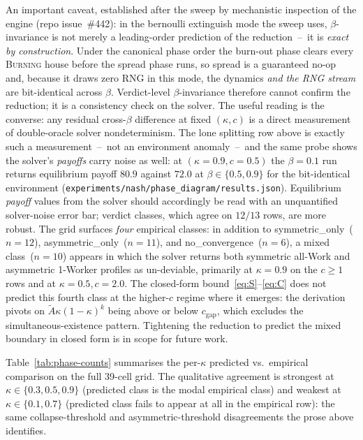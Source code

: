 \documentclass{anvil-paper}
\begin{document}
An important caveat, established after the sweep by mechanistic
inspection of the engine (repo issue~\#442): in the bernoulli extinguish
mode the sweep uses, $\beta$-invariance is not merely a leading-order
prediction of the reduction~--~it is \emph{exact by construction}. Under
the canonical phase order the burn-out phase clears every
\textsc{Burning} house before the spread phase runs, so spread is a
guaranteed no-op and, because it draws zero RNG in this mode, the
dynamics \emph{and the RNG stream} are bit-identical across $\beta$.
Verdict-level $\beta$-invariance therefore cannot confirm the reduction;
it is a consistency check on the solver. The useful reading is the
converse: any residual cross-$\beta$ difference at fixed $(\kappa,c)$ is
a direct measurement of double-oracle solver nondeterminism. The lone
splitting row above is exactly such a measurement~--~not an environment
anomaly~--~and the same probe shows the solver's \emph{payoffs} carry
noise as well: at $(\kappa{=}0.9,c{=}0.5)$ the $\beta{=}0.1$ run
returns equilibrium payoff $80.9$ against $72.0$ at
$\beta\in\{0.5,0.9\}$ for the bit-identical environment
(\texttt{experiments/nash/phase\_diagram/results.json}). Equilibrium
\emph{payoff} values from the solver should accordingly be read with an
unquantified solver-noise error bar; verdict classes, which agree on
$12/13$ rows, are more robust. The grid surfaces \emph{four}
empirical classes: in addition to \textsf{symmetric\_only}~($n{=}12$),
\textsf{asymmetric\_only}~($n{=}11$), and \textsf{no\_convergence}~($n{=}6$),
a \textsf{mixed} class~($n{=}10$) appears in which the solver returns both
symmetric all-Work and asymmetric 1-Worker profiles as un-deviable,
primarily at $\kappa{=}0.9$ on the $c{\geq}1$ rows and at $\kappa{=}0.5,
c{=}2.0$. The closed-form bound~\eqref{eq:S}--\eqref{eq:C} does not predict
this fourth class at the higher-$c$ regime where it emerges: the derivation
pivots on $\tilde A\kappa(1-\kappa)^{k}$ being above or below
$c_{\text{gap}}$, which excludes the simultaneous-existence pattern.
Tightening the reduction to predict the \textsf{mixed} boundary in closed
form is in scope for future work.

Table~\ref{tab:phase-counts} summarises the per-$\kappa$ predicted
vs.\ empirical comparison on the full 39-cell grid. The qualitative
agreement is strongest at $\kappa\in\{0.3, 0.5, 0.9\}$ (predicted
class is the modal empirical class) and weakest at $\kappa\in\{0.1, 0.7\}$
(predicted class fails to appear at all in the empirical row): the same
collapse-threshold and asymmetric-threshold disagreements the prose
above identifies.
\end{document}
